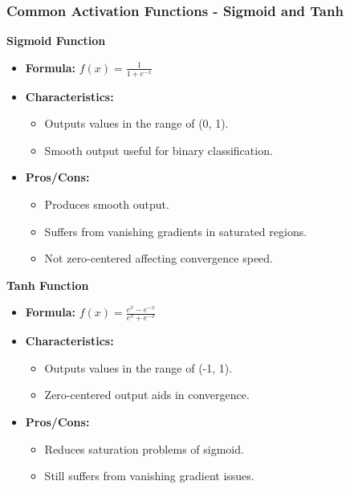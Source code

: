 \documentclass[aspectratio=169]{beamer}
\begin{document}
\begin{frame}[fragile]
    \frametitle{Common Activation Functions - Sigmoid and Tanh}
    \textbf{Sigmoid Function}
    \begin{itemize}
        \item \textbf{Formula:} $f(x) = \frac{1}{1 + e^{-x}}$
        \item \textbf{Characteristics:}
        \begin{itemize}
            \item Outputs values in the range of (0, 1).
            \item Smooth output useful for binary classification.
        \end{itemize}
        \item \textbf{Pros/Cons:}
        \begin{itemize}
            \item Produces smooth output.
            \item Suffers from vanishing gradients in saturated regions.
            \item Not zero-centered affecting convergence speed.
        \end{itemize}
    \end{itemize}

    \textbf{Tanh Function}
    \begin{itemize}
        \item \textbf{Formula:} $f(x) = \frac{e^x - e^{-x}}{e^x + e^{-x}}$
        \item \textbf{Characteristics:}
        \begin{itemize}
            \item Outputs values in the range of (-1, 1).
            \item Zero-centered output aids in convergence.
        \end{itemize}
        \item \textbf{Pros/Cons:}
        \begin{itemize}
            \item Reduces saturation problems of sigmoid.
            \item Still suffers from vanishing gradient issues.
        \end{itemize}
    \end{itemize}
\end{frame}
\end{document}
